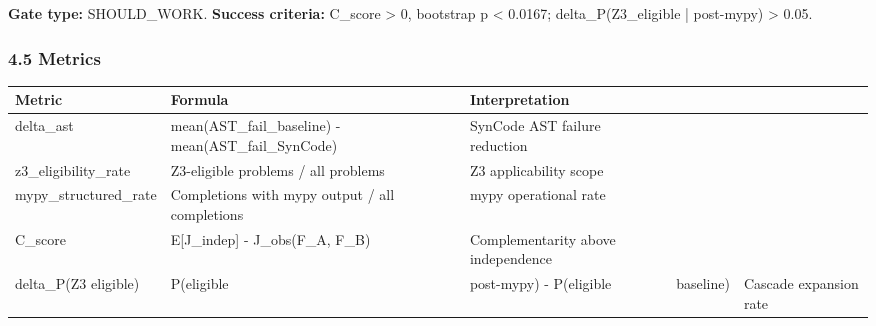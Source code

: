 \textbf{Gate type:} SHOULD_WORK. \textbf{Success criteria:} C_score > 0, bootstrap p < 0.0167; delta_P(Z3_eligible | post-mypy) > 0.05.

\subsubsection{4.5 Metrics}

\begin{table}[htbp]
\centering
\begin{tabular}{lllll}
\toprule
Metric & Formula & Interpretation &  &  \\
\midrule
delta_ast & mean(AST_fail_baseline) - mean(AST_fail_SynCode) & SynCode AST failure reduction &  &  \\
z3_eligibility_rate & Z3-eligible problems / all problems & Z3 applicability scope &  &  \\
mypy_structured_rate & Completions with mypy output / all completions & mypy operational rate &  &  \\
C_score & E[J_indep] - J_obs(F_A, F_B) & Complementarity above independence &  &  \\
delta_P(Z3 eligible) & P(eligible & post-mypy) - P(eligible & baseline) & Cascade expansion rate \\
\bottomrule
\end{tabular}
\end{table}
